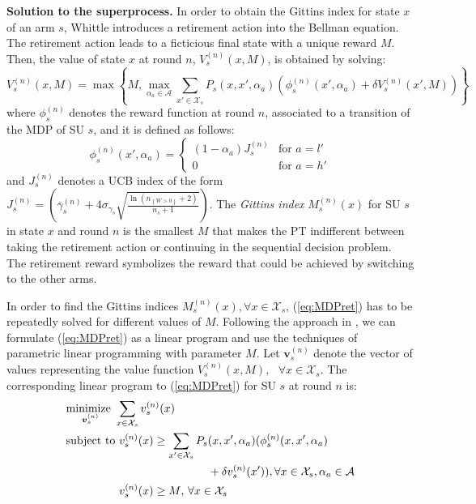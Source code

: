 \textbf{Solution to the superprocess.} In order to obtain the Gittins index for state $x$ of an arm $s$, Whittle introduces a retirement action into the Bellman equation.
The retirement action leads to a ficticious final state with a unique reward $M$. Then, the value of state $x$ at round $n$, $V_s^{(n)}(x,M)$, is obtained by solving:
\begin{equation}\label{eq:MDPret}
V_s^{(n)}(x,M) = \max\left\{M, \max_{\alpha_a \in \mathcal{A}} \sum_{x' \in \mathcal{X}_s} P_s(x,x',\alpha_a)\left(\phi_s^{(n)}(x',\alpha_a)+\delta V_s^{(n)}(x',M)\right)\right\}
\end{equation}
where $\phi_s^{(n)}$ denotes the reward function at round $n$, associated to a transition of the MDP of SU $s$, and it is defined as follows:
\begin{equation}
\phi_s^{(n)}(x',\alpha_a) = 
\begin{cases}
    (1 - \alpha_a) J_s^{(n)} & \text{for } a = l'\\
    0 & \text{for } a = h'
   \end{cases}
\end{equation}
and $J_s^{(n)}$ denotes a UCB index of the form $J_s^{(n)} = \left(\overline{\gamma}_{s}^{(n)}+4\sigma_{\gamma_s}\sqrt{\frac{\ln{(n_{\left\{W>0\right\}}+2)}}{n_s+1}}\right)$.
The \textit{Gittins index} $M_s^{(n)}(x)$ for SU $s$ in state $x$ and round $n$ is the smallest $M$ that makes the PT indifferent between taking the retirement action or continuing in the sequential decision problem. The retirement reward symbolizes the reward that could be achieved by switching to the other arms.

In order to find the Gittins indices $M_s^{(n)}(x), \forall x \in \mathcal{X}_s$, (\ref{eq:MDPret}) has to be repeatedly solved for different values of $M$. Following the approach in \cite{ref:Brown2013}, we can formulate (\ref{eq:MDPret}) as a linear program \cite{ref:Bertsekas2005} and use the techniques of parametric linear programming with parameter $M$.
Let $\boldsymbol{v}_s^{(n)}$ denote the vector of values representing the value function $V_s^{(n)}(x,M),\text{ }\forall x \in \mathcal{X}_s$. The corresponding linear program to (\ref{eq:MDPret}) for SU $s$ at round $n$ is: 
\begin{equation}
\begin{split}
  &\underset{\boldsymbol{v}_s^{(n)}}{\text{minimize }}\sum_{x \in \mathcal{X}_s} v_s^{(n)}(x)\\
  &\text{subject to }v_s^{(n)}(x) \geq \sum_{x' \in \mathcal{X}_s}  P_s(x,x',\alpha_a)(\phi_s^{(n)}(x,x',\alpha_a)\\
  &\hphantom{\text{subject to }v_s^{(n)}(x) \geq \sum_{x' \in \mathcal{X}_s} P_s}+\delta v_s^{(n)}(x')), \forall x \in \mathcal{X}_s,\alpha_a \in \mathcal{A}\\
  &\hphantom{\text{subject to }}v_s^{(n)}(x)\geq M \text{,    }\forall x \in \mathcal{X}_s
\end{split}
\end{equation}

